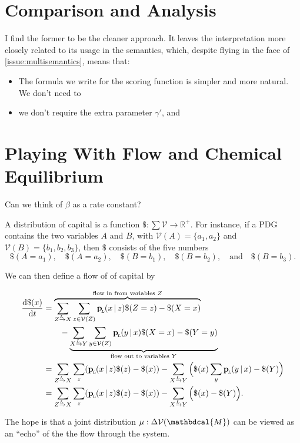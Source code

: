 \documentclass[twoside]{article} %
\theoremstyle{plain}
\theoremstyle{definition}
\newcommand{\mat}[1]{\mathbf{#1}}
\newcommand{\ssub}[1]{_{\!_{#1}\!}}
\newcommand{\bp}[1][L]{\mat{p}\ssub{#1}}
\newcommand{\V}{\mathcal V}
\newcommand{\dg}[1]{\mathbdcal{#1}}
\newcommand{\ed}[3]{#2%
    	  \overset{\smash{\mskip-5mu\raisebox{-1pt}{$\scriptscriptstyle
    	        #1$}}}{\rightarrow} #3}
\begin{document}
    \section{Comparison and Analysis} \label{sec:analysis}
    I find the former to be the cleaner approach. It leaves the interpretation more closely related to its usage in the semantics, which, despite flying in the face of \cref{issue:multisemantics}, means that:

    \begin{itemize}
        \item The formula we write for the scoring function is simpler and more natural.
            We don't need to
        \item we don't require the extra parameter $\gamma'$, and

    \end{itemize}



\clearpage
    \section*{Playing With Flow and Chemical Equilibrium}
    Can we think of $\beta$ as a rate constant?

    \begin{defn}
        A distribution of capital is a function $\$ : \sum \V \to \mathbb R^+$.
        For instance, if a PDG contains the two variables $A$ and $B$, with $\V(A) = \{a_1, a_2\}$ and $\V(B) = \{b_1, b_2, b_3\}$, then $\$$ consists of the five numbers
        \[
            \$(A\!=\!a_1),\quad
            \$(A\!=\!a_2),\quad
            \$(B\!=\!b_1),\quad
            \$(B\!=\!b_2),\quad\text{and}\quad
            \$(B\!=\!b_3).
        \]
    \end{defn}


    We can then define a flow of of capital by

    \begin{align*}
        \frac{\mathrm d \$(x) }{\mathrm dt} &=
            \overbrace{%
                \sum_{\ed LZX} \sum_{z \in \V(Z)} \bp(x\,|\,z) \$(Z=z)-\$(X=x)
            }^{\text{flow in from variables $Z$}} \\
            &\qquad -
                \underbrace{%
                \sum_{\ed LXY} \sum_{y \in \V(Z)} \bp(y\,|\,x) \$(X=x)-\$(Y=y)
                }_{\text{flow out to variables $Y$}}
            \\
            &= \sum_{\ed LZX} \sum_z (\bp(x\,|\,z) \$(z)-\$(x))
                -\sum_{\ed LXY} \Big(\$(x)\sum_{y} \bp(y\,|\,x) - \$(Y) \Big) \\
            &= \sum_{\ed LZX} \sum_z (\bp(x\,|\,z) \$(z)-\$(x))
                -\sum_{\ed LXY} \Big(\$(x) - \$(Y) \Big)
            .
    \end{align*}


    The hope is that a joint distribution $\mu : \Delta \V(\dg M)$ can be viewed as an ``echo'' of the the flow through the system.


    \begin{example}

    \end{example}
\end{document}
